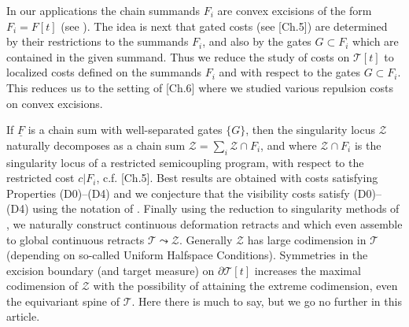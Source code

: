 \documentclass[12pt]{amsart}
\newtheorem{lem}[thm]{Lemma}
\newtheorem*{prob}{Problem}
\theoremstyle{definition}
\theoremstyle{remark}
\newcommand{\del}{\partial}
\newcommand{\uF}{\underline{F}}
\newcommand{\sT}{\mathscr{T}}
\newcommand{\sZ}{\mathscr{Z}}
\begin{document}
In our applications the chain summands $F_i$ are convex excisions of the form $F_i=F[t]$ (see \cite{martel}). The idea is next that gated costs (see \cite{martel}[Ch.5]) are determined by their restrictions to the summands $F_i$, and also by the gates $G\subset F_i$ which are contained in the given summand. Thus we reduce the study of costs on $\sT[t]$ to localized costs defined on the summands $F_i$ and with respect to the gates $G\subset F_i$. This reduces us to the setting of \cite{martel}[Ch.6] where we studied various repulsion costs on convex excisions. 

If $\uF$ is a chain sum with well-separated gates $\{G\}$, then the singularity locus $\sZ$ naturally decomposes as a chain sum $\sZ=\sum_i \sZ \cap F_i$, and where $\sZ \cap F_i$ is the singularity locus of a restricted semicoupling program, with respect to the restricted cost $c|F_i$, c.f. \cite{martel}[Ch.5]. Best results are obtained with costs satisfying Properties (D0)--(D4) and we conjecture that the visibility costs satisfy (D0)--(D4) using the notation of \cite{martel}. Finally using the reduction to singularity methods of \cite{martel}, we naturally construct continuous deformation retracts and which even assemble to global continuous retracts $\sT \leadsto \sZ$. Generally $\sZ$ has large codimension in $\sT$ (depending on so-called Uniform Halfspace Conditions). Symmetries in the excision boundary (and target measure) on $\del \sT[t]$ increases the maximal codimension of $\sZ$ with the possibility of attaining the extreme codimension, even the equivariant spine of $\sT$. Here there is much to say, but we go no further in this article.


 





 
\end{document}

